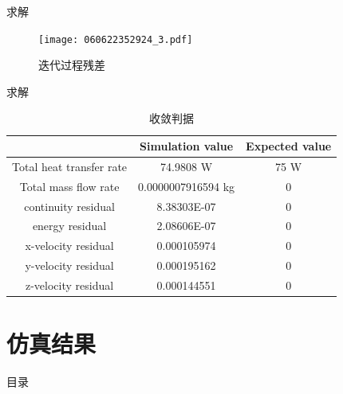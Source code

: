 \documentclass[UTF8,9pt]{ctexbeamer}
\begin{document}
\begin{frame}{求解}
	\begin{figure}
		\texttt{[image: 060622352924\_3.pdf]}
		\caption{迭代过程残差}
	\end{figure}	
\end{frame}
\begin{frame}{求解}
	\begin{table}[]
		\begin{tabular}{|c|c|c|}
		\hline
		\multicolumn{1}{|l|}{}   & Simulation value   & Expected value \\ \hline
		Total heat transfer rate & 74.9808 W          & 75 W           \\ \hline
		Total mass flow rate     & 0.0000007916594 kg & 0              \\ \hline
		continuity residual      & 8.38303E-07        & 0              \\ \hline
		energy residual          & 2.08606E-07        & 0              \\ \hline
		x-velocity residual      & 0.000105974        & 0              \\ \hline
		y-velocity residual      & 0.000195162        & 0              \\ \hline
		z-velocity residual      & 0.000144551        & 0              \\ \hline
		\end{tabular}
		\caption{收敛判据}
		\end{table}	

\end{frame}

\section{仿真结果}

\begin{frame}{目录}
    \tableofcontents[currentsection]
\end{frame}
\end{document}
